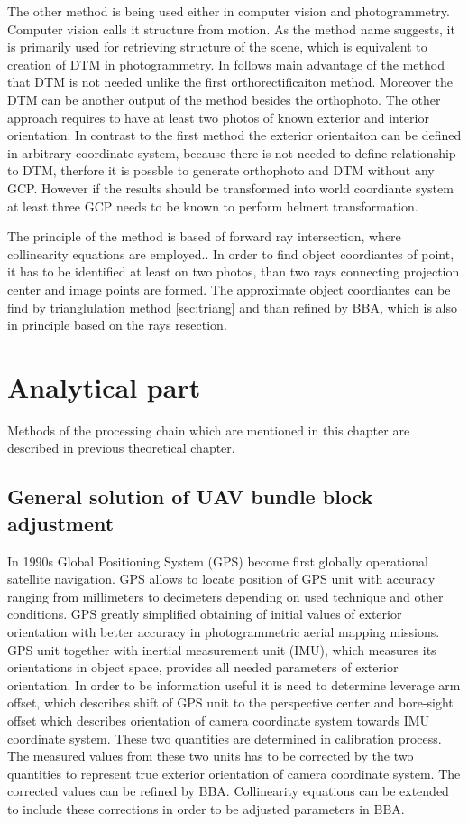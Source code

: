 \documentclass[a4paper,12pt]{article}
\begin{document}
The other method is being used either in computer vision and photogrammetry.
Computer vision calls it structure from motion. As the method name suggests, it is primarily used for retrieving
structure of the scene, which is equivalent to creation of DTM in photogrammetry. In follows main advantage 
of the method that DTM is not needed unlike the first orthorectificaiton method. Moreover 
the DTM can be another output of the method besides the orthophoto.  The other approach requires to have at least
two photos of known exterior and interior orientation. In contrast to the first method the exterior orientaiton
can be defined in arbitrary coordinate system, because there is not needed to define relationship to DTM, 
therfore it is possble to generate orthophoto and DTM without any GCP. However 
if the results should be transformed into world coordiante system at least three GCP needs to be known
to perform helmert transformation. 


The principle of the method is based of forward ray intersection, where collinearity equations are employed..
In order to find object coordiantes
of point, it has to be identified at least on two photos, than two rays connecting projection 
center and image points are formed. The approximate object coordiantes can be find by trianglulation 
method \ref{sec:triang} and than refined by BBA, which is also in principle based on the rays 
resection.
 

\section{Analytical part}

Methods of the processing chain which are mentioned in this chapter are described in 
previous theoretical chapter.

\subsection{General solution of UAV bundle block adjustment}


In 1990s Global Positioning System (GPS) become first globally operational satellite navigation.
GPS allows 
to locate position of GPS unit with accuracy ranging  from  millimeters to decimeters depending 
on used technique and other conditions. 
GPS greatly simplified obtaining of initial values of exterior orientation with better accuracy in photogrammetric aerial mapping missions.
GPS unit together with 
inertial measurement unit (IMU), which measures its orientations in object space,
provides all needed parameters of exterior orientation. In order to be information useful it is need to determine 
leverage arm offset, which describes shift of GPS unit to the perspective center and bore-sight offset
which describes orientation of camera coordinate system towards IMU coordinate system. These two
quantities are determined in calibration process. The measured values from these two units has to
be corrected by the two quantities to represent true exterior orientation of camera coordinate system. The corrected values 
can be refined by BBA. Collinearity equations can be extended to include these corrections in order to be adjusted parameters 
 in BBA.
\end{document}

